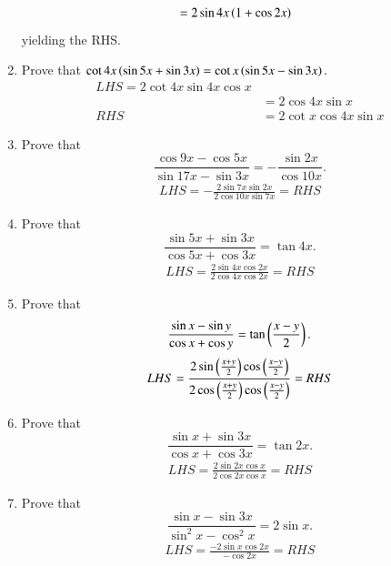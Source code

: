 \begin{enumerate}[label=\thesubsection.\arabic*,ref=\thesubsection.\theenumi,itemsep=1ex]
\begin{align}
	&=2\sin4x\left(1+\cos 2x\right) 
\end{align}
yielding the RHS.
\item Prove that
$\cot4x\left(\sin5x+\sin3x\right)= \cot x\left(\sin5x-\sin3x\right).$
%
\\
\solution  
\begin{align}
	LHS = 
2\cot4x\sin4x\cos x
\\
	&= 
2\cos4x\sin x
	\\
	RHS&=2\cot x\cos 4x \sin x
\end{align}
\item Prove that
$$\frac{\cos9x-\cos5x}{\sin17x-\sin3x}=-\frac{\sin2x}{\cos10x}.$$
%
\solution
\begin{align}
LHS = -\frac{2 \sin7x\sin 2x}{2\cos 10x\sin7x}
=RHS
\end{align}
\item Prove that
$$\frac{\sin5x+\sin3x}{\cos5x+\cos3x}=\tan4x.$$
%
\solution
\begin{align}
LHS = \frac{2\sin4x\cos 2x}{2\cos4x\cos2x}=RHS
\end{align}
\item Prove that
$$\frac{\sin x-\sin y}{\cos x+\cos y}=\tan\left(\frac{x-y}{2}\right).$$
%
\solution 
\begin{align}
LHS = \frac{2\sin \left(\frac{x+y}{2}\right)\cos\left(\frac{x-y}{2}\right)}{2\cos\left(\frac{x+y}{2}\right)\cos\left(\frac{x-y}{2}\right)}=RHS
\end{align}
\item Prove that
$$\frac{\sin x+\sin3x}{\cos x+\cos3x}=\tan2x.$$
%
\solution 
\begin{align}
	LHS=
\frac{2\sin 2x \cos x}{2\cos 2x\cos x}=RHS
\end{align}
\item Prove that
$$\frac{\sin x-\sin3x}{\sin^{2}x-\cos^{2}x}=2\sin x.$$
%
\solution
\begin{align}
LHS = \frac{-2\sin x\cos2x}{-\cos{2}x}=RHS
\end{align}


\end{enumerate}

